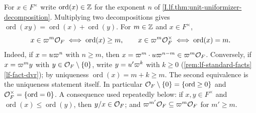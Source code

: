 \begin{remark}\label{rem:lf-ord}
For $x\in F^\times$ write $\operatorname{ord}(x)\in\mathbb{Z}$ for the exponent $n$ of
\cref{I.lf.thm:unit-uniformizer-decomposition}. Multiplying two decompositions gives
$\operatorname{ord}(xy)=\operatorname{ord}(x)+\operatorname{ord}(y)$. For $m\in\mathbb{Z}$ and $x\in F^\times$,
\[
  x\in\varpi^m\mathcal{O}_F\iff\operatorname{ord}(x)\ge m,\qquad x\in\varpi^m\mathcal{O}_F^\times\iff\operatorname{ord}(x)=m .
\]
Indeed, if $x=u\varpi^n$ with $n\ge m$, then $x=\varpi^m\cdot u\varpi^{n-m}\in\varpi^m\mathcal{O}_F$. Conversely, if
$x=\varpi^m y$ with $y\in\mathcal{O}_F\setminus\{0\}$, write $y=u'\varpi^{k}$ with $k\ge0$
(\cref{rem:lf-standard-facts}\ref{lf-fact-dvr}); by uniqueness $\operatorname{ord}(x)=m+k\ge m$. The second
equivalence is the uniqueness statement itself. In particular $\mathcal{O}_F\setminus\{0\}=\{\operatorname{ord}\ge0\}$ and
$\mathcal{O}_F^\times=\{\operatorname{ord}=0\}$. A consequence used repeatedly below: if $x,y\in F^\times$ and
$\operatorname{ord}(x)\le\operatorname{ord}(y)$, then $y/x\in\mathcal{O}_F$; and $\varpi^{m'}\mathcal{O}_F\subseteq\varpi^m\mathcal{O}_F$
for $m'\ge m$.
\end{remark}

